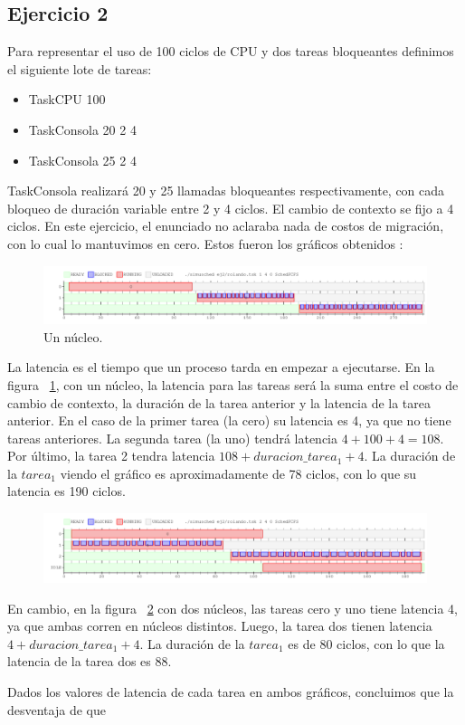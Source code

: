 \subsection{Ejercicio 2}

Para representar el uso de 100 ciclos de CPU y dos tareas bloqueantes definimos el siguiente lote de tareas:\\

\begin{itemize}
\item TaskCPU 100 
\item TaskConsola 20 2 4
\item TaskConsola 25 2 4
\end{itemize}
TaskConsola realizará 20 y 25 llamadas bloqueantes respectivamente, con cada bloqueo de duración variable entre 2 y 4 ciclos. El cambio de contexto se fijo a 4 ciclos. En este ejercicio, el enunciado no aclaraba nada de costos de migración, con lo cual lo mantuvimos en cero. Estos fueron los gráficos obtenidos :



\begin{figure}[h]
  \includegraphics[width=\textwidth]{../ej2/uncore.png}
  \caption{Un núcleo.}
  \label{fig:unnucleo}
\end{figure}

La latencia es el tiempo que un proceso tarda en empezar a ejecutarse. En la figura ~\ref{fig:unnucleo}, con un núcleo, la latencia para las tareas será la suma entre el costo de cambio de contexto, la duración de la tarea anterior y la latencia de la tarea anterior. En el caso de la primer tarea (la cero) su latencia es 4, ya que no tiene tareas anteriores. La segunda tarea (la uno) tendrá latencia $ 4 + 100 + 4 = 108$. Por último, la tarea 2 tendra latencia $ 108 + duracion\_tarea_{1} + 4$. La duración de la $tarea_{1}$ viendo el gráfico es aproximadamente de 78 ciclos, con lo que su latencia es 190 ciclos.




\begin{figure}[h]
  \includegraphics[width=\textwidth]{../ej2/doscores.png}
  \caption{}
  \label{fig:dosnucleos}
\end{figure}

En cambio, en la figura ~\ref{fig:dosnucleos} con dos núcleos, las tareas cero y uno tiene latencia 4, ya que ambas corren en núcleos distintos. Luego, la tarea  dos tienen latencia $4 + duracion\_tarea_{1} + 4$. La duración de la $tarea_{1}$ es de 80 ciclos, con lo que la latencia de la tarea dos es 88.

Dados los valores de latencia de cada tarea en ambos gráficos, concluimos que la desventaja de que 

